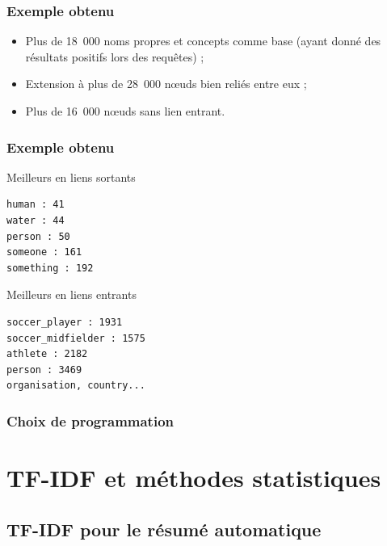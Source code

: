 \documentclass[12pt, handout]{beamer}
\begin{document}
\begin{frame}
  \frametitle{Exemple obtenu}
  
  \begin{itemize}
   \item Plus de 18~000 noms propres et concepts comme base (ayant donné des résultats positifs lors des requêtes) ;
   \item Extension à plus de 28~000 n\oe uds bien reliés entre eux ;
   \item Plus de 16~000 n\oe uds sans lien entrant.
  \end{itemize}

  
\end{frame}

\begin{frame}[fragile]
 \frametitle{Exemple obtenu}
 
 \begin{block}{Meilleurs en liens sortants}
  \begin{verbatim}
human : 41
water : 44
person : 50
someone : 161
something : 192 
  \end{verbatim}
 \end{block}

  \begin{block}{Meilleurs en liens entrants}
    \begin{verbatim}
soccer_player : 1931
soccer_midfielder : 1575
athlete : 2182
person : 3469
organisation, country...
    \end{verbatim}
  \end{block}
\end{frame}


\begin{frame}
 \frametitle{Choix de programmation}
 
 
\end{frame}


\section{TF-IDF et méthodes statistiques}

\subsection{TF-IDF pour le résumé automatique}
\end{document}
